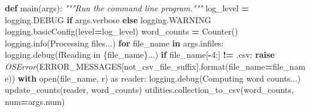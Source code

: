 \documentclass[
]{krantz}
\makeatletter
\newenvironment{Shaded}{\begin{snugshade}}{\end{snugshade}}
\newcommand{\BuiltInTok}[1]{#1}
\newcommand{\CommentTok}[1]{\textcolor[rgb]{0.56,0.35,0.01}{\textit{#1}}}
\newcommand{\ControlFlowTok}[1]{\textcolor[rgb]{0.13,0.29,0.53}{\textbf{#1}}}
\newcommand{\DecValTok}[1]{\textcolor[rgb]{0.00,0.00,0.81}{#1}}
\newcommand{\ImportTok}[1]{#1}
\newcommand{\KeywordTok}[1]{\textcolor[rgb]{0.13,0.29,0.53}{\textbf{#1}}}
\newcommand{\NormalTok}[1]{#1}
\newcommand{\OperatorTok}[1]{\textcolor[rgb]{0.81,0.36,0.00}{\textbf{#1}}}
\newcommand{\PreprocessorTok}[1]{\textcolor[rgb]{0.56,0.35,0.01}{\textit{#1}}}
\newcommand{\SpecialCharTok}[1]{\textcolor[rgb]{0.00,0.00,0.00}{#1}}
\newcommand{\SpecialStringTok}[1]{\textcolor[rgb]{0.31,0.60,0.02}{#1}}
\newcommand{\StringTok}[1]{\textcolor[rgb]{0.31,0.60,0.02}{#1}}
\newenvironment{kframe}{%
\medskip{}
\setlength{\fboxsep}{.8em}
 \def\at@end@of@kframe{}%
 \ifinner\ifhmode%
  \def\at@end@of@kframe{\end{minipage}}%
  \begin{minipage}{\columnwidth}%
 \fi\fi%
 \def\FrameCommand##1{\hskip\@totalleftmargin \hskip-\fboxsep
 \colorbox{shadecolor}{##1}\hskip-\fboxsep
     \hskip-\linewidth \hskip-\@totalleftmargin \hskip\columnwidth}%
 \MakeFramed {\advance\hsize-\width
   \@totalleftmargin\z@ \linewidth\hsize
   \@setminipage}}%
 {\par\unskip\endMakeFramed%
 \at@end@of@kframe}
\renewenvironment{Shaded}{\begin{kframe}}{\end{kframe}}
\makeatother
\begin{document}
\begin{Shaded}
\begin{Highlighting}[]
\KeywordTok{def}\NormalTok{ main(args):}
    \CommentTok{"""Run the command line program."""}
\NormalTok{    log\_level }\OperatorTok{=}\NormalTok{ logging.DEBUG }\ControlFlowTok{if}\NormalTok{ args.verbose }\ControlFlowTok{else}\NormalTok{ logging.WARNING}
\NormalTok{    logging.basicConfig(level}\OperatorTok{=}\NormalTok{log\_level)}
\NormalTok{    word\_counts }\OperatorTok{=}\NormalTok{ Counter()}
\NormalTok{    logging.info(}\StringTok{\textquotesingle{}Processing files...\textquotesingle{}}\NormalTok{)}
    \ControlFlowTok{for}\NormalTok{ file\_name }\KeywordTok{in}\NormalTok{ args.infiles:}
\NormalTok{        logging.debug(}\SpecialStringTok{f\textquotesingle{}Reading in }\SpecialCharTok{\{}\NormalTok{file\_name}\SpecialCharTok{\}}\SpecialStringTok{...\textquotesingle{}}\NormalTok{)}
        \ControlFlowTok{if}\NormalTok{ file\_name[}\OperatorTok{{-}}\DecValTok{4}\NormalTok{:] }\OperatorTok{!=} \StringTok{\textquotesingle{}.csv\textquotesingle{}}\NormalTok{:}
            \ControlFlowTok{raise} \PreprocessorTok{OSError}\NormalTok{(ERROR\_MESSAGES[}\StringTok{\textquotesingle{}not\_csv\_file\_suffix\textquotesingle{}}\NormalTok{].}\BuiltInTok{format}\NormalTok{(file\_name}\OperatorTok{=}\NormalTok{file\_name))}
        \ControlFlowTok{with} \BuiltInTok{open}\NormalTok{(file\_name, }\StringTok{\textquotesingle{}r\textquotesingle{}}\NormalTok{) }\ImportTok{as}\NormalTok{ reader:}
\NormalTok{            logging.debug(}\StringTok{\textquotesingle{}Computing word counts...\textquotesingle{}}\NormalTok{)}
\NormalTok{            update\_counts(reader, word\_counts)}
\NormalTok{    utilities.collection\_to\_csv(word\_counts, num}\OperatorTok{=}\NormalTok{args.num)}


\end{Highlighting}
\end{Shaded}
\end{document}
